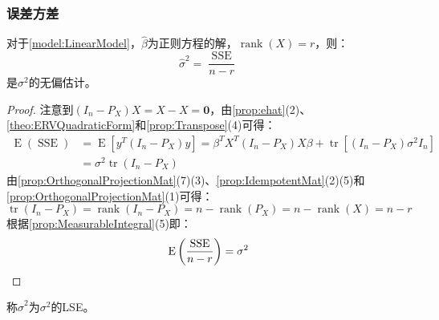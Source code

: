 \subsubsection{误差方差}
\begin{theorem}\label{theo:VarianceOfErrorTerm}
	对于\cref{model:LinearModel}，$\hat{\beta}$为正则方程的解，$\operatorname{rank}(X)=r$，则：
	\begin{equation*}
		\hat{\sigma}^2=\frac{\operatorname{SSE}}{n-r}
	\end{equation*}
	是$\sigma^2$的无偏估计。
\end{theorem}
\begin{proof}
	注意到$(I_n-P_X)X=X-X=\mathbf{0}$，由\cref{prop:ehat}(2)、\cref{theo:ERVQuadraticForm}和\cref{prop:Transpose}(4)可得：
	\begin{align*}
		\operatorname{E}(\operatorname{SSE})&=\operatorname{E}[y^T(I_n-P_X)y] =\beta^TX^T(I_n-P_X)X\beta+\operatorname{tr}[(I_n-P_X)\sigma^2I_n] \\
		&=\sigma^2\operatorname{tr}(I_n-P_X)
	\end{align*}
	由\cref{prop:OrthogonalProjectionMat}(7)(3)、\cref{prop:IdempotentMat}(2)(5)和\cref{prop:OrthogonalProjectionMat}(1)可得：
	\begin{equation*}
		\operatorname{tr}(I_n-P_X)=\operatorname{rank}(I_n-P_X)=n-\operatorname{rank}(P_X)=n-\operatorname{rank}(X)=n-r
	\end{equation*}
	根据\cref{prop:MeasurableIntegral}(5)即：
	\begin{equation*}
		\operatorname{E}\left(\frac{\operatorname{SSE}}{n-r}\right)=\sigma^2\qedhere
	\end{equation*}
\end{proof}
\begin{definition}
	称$\hat{\sigma}^2$为$\sigma^2$的LSE。
\end{definition}

